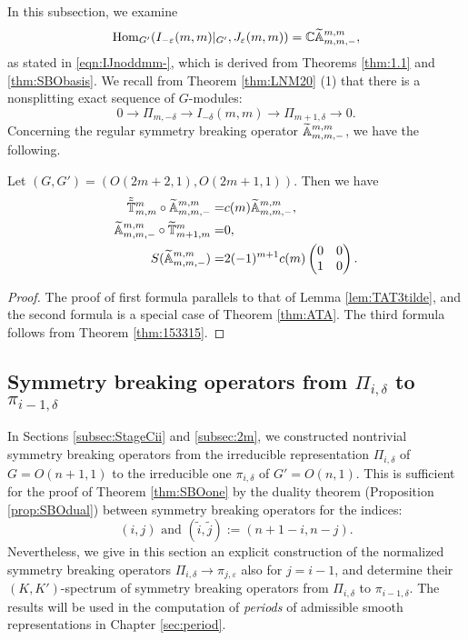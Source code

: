 In this subsection,
 we examine 
\[
  {\operatorname{Hom}}_{G'}
  (I_{-\varepsilon}(m,m)|_{G'}, J_{\varepsilon}(m,m))
 ={\mathbb{C}} {\widetilde{\mathbb{A}}}_{{m},{m},{-}}^{{m,m}}, 
\]
as stated in \eqref{eqn:IJnoddmm-}, 
 which is derived from Theorems \ref{thm:1.1} and \ref{thm:SBObasis}.  
We recall from Theorem \ref{thm:LNM20} (1)
 that there is a nonsplitting exact sequence of $G$-modules:
\[
   0 \to \Pi_{m,-\delta} \to I_{-\delta}(m,m) \to \Pi_{m+1,\delta} \to 0.  
\]
Concerning the regular symmetry breaking operator ${\widetilde{\mathbb{A}}}_{{m},{m},{-}}^{{m,m}}$, 
 we have the following.  
\begin{lemma}
\label{lem:IHP080328}
Let $(G,G')=(O(2m+2,1),O(2m+1,1))$.  
Then we have
\begin{align*}
   \tilde{\tilde{{\mathbb{T}}}}_{{m},{m}}^{{m}} \circ {\widetilde{\mathbb{A}}}_{{m},{m},{-}}^{{m,m}}
 =& c(m) {\widetilde{\mathbb{A}}}_{{m},{m},{-}}^{{m,m}}, 
\\
   {\widetilde{\mathbb{A}}}_{{m},{m},{-}}^{{m,m}} \circ \widetilde{{\mathbb{T}}}_{{m+1},{m}}^{{m}} =&0, 
\\
   S({\widetilde{\mathbb{A}}}_{{m},{m},{-}}^{{m,m}})=& 2(-1)^{m+1} c(m) \begin{pmatrix} 0 & 0 \\ 1 & 0\end{pmatrix}.  
\end{align*}
\end{lemma}

\begin{proof}
The proof of first formula parallels to that of Lemma \ref{lem:TAT3tilde}, 
 and the second formula is a special case of Theorem \ref{thm:ATA}.  
The third formula follows from Theorem \ref{thm:153315}.  
\end{proof}

\subsection{Symmetry breaking operators from $\Pi_{i,\delta}$ to $\pi_{i-1,\delta}$}
\label{subsec:SBOrho-}

In Sections \ref{subsec:StageCii} and \ref{subsec:2m}, 
 we constructed nontrivial symmetry breaking operators from 
 the irreducible representation $\Pi_{i,\delta}$ of $G=O(n+1,1)$
 to the irreducible one $\pi_{i,\delta}$ of $G'=O(n,1)$.  
This is sufficient for the proof of Theorem \ref{thm:SBOone}
 by the duality theorem
 (Proposition \ref{prop:SBOdual})
 between symmetry breaking operators
 for the indices:
\[
   \text{$(i,j)$ and $(\widetilde i,\widetilde j):=(n+1-i, n-j)$}.  
\]
Nevertheless,
 we give in this section an explicit construction
 of the normalized symmetry breaking operators
 $\Pi_{i,\delta} \to \pi_{j,\varepsilon}$
 also for $j=i-1$, 
 and determine their $(K,K')$-spectrum 
 of symmetry breaking operators from $\Pi_{i,\delta}$ to $\pi_{i-1,\delta}$.  
The results will be used in the computation
 of {\it{periods}} of admissible smooth representations 
 in Chapter \ref{sec:period}.  



